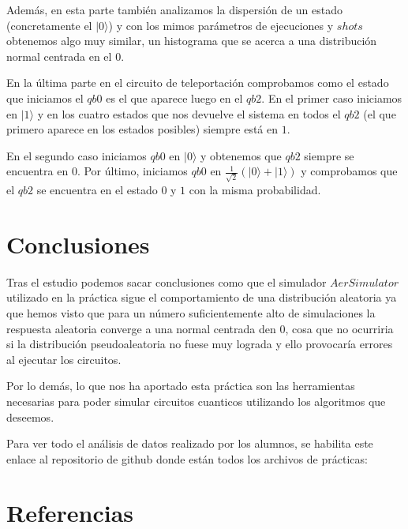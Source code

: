 \documentclass[11pt, a4paper, twocolumn]{article}
\begin{document}
\vspace{0.2cm}

Además, en esta parte también analizamos la dispersión de un estado (concretamente
el $|0\rangle$) y con los mimos parámetros de ejecuciones y $shots$ obtenemos 
algo muy similar, un histograma que se acerca a una distribución normal centrada
en el $0$.

\vspace{0.4cm}

En la última parte en el circuito de teleportación comprobamos como el estado que
iniciamos el $qb0$ es el que aparece luego en el $qb2$. En el primer caso iniciamos
en $|1\rangle$ y en los cuatro estados que nos devuelve el sistema en todos el $qb2$
(el que primero aparece en los estados posibles) siempre está en $1$. 

\vspace{0.2cm}

En el segundo caso iniciamos $qb0$ en $|0\rangle$ y obtenemos que $qb2$ siempre
se encuentra en $0$. Por último, iniciamos $qb0$ en $\frac{1}{\sqrt{2}}(|0\rangle + |1\rangle)$ y 
comprobamos que el $qb2$ se encuentra en el estado $0$ y $1$ con la misma probabilidad.

\section{Conclusiones}

Tras el estudio podemos sacar conclusiones como que el simulador $AerSimulator$ 
utilizado en la práctica sigue el comportamiento de una distribución aleatoria ya
que hemos visto que para un número suficientemente alto de simulaciones 
la respuesta aleatoria converge a una normal centrada den $0$, cosa que no ocurriria
si la distribución pseudoaleatoria no fuese muy lograda y ello provocaría errores
al ejecutar los circuitos.

\vspace{0.2cm}

Por lo demás, lo que nos ha aportado esta práctica son las herramientas necesarias
para poder simular circuitos cuanticos utilizando los algoritmos que deseemos.

\vspace{1cm}
Para ver todo el análisis de datos realizado por los alumnos, se habilita este 
enlace al repositorio de 
github donde están todos los archivos de prácticas: 
\cite{experimental32026}

\section{Referencias}

\nocite{experimental32026}
\nocite{teleportation}

\printbibliography
\end{document}
